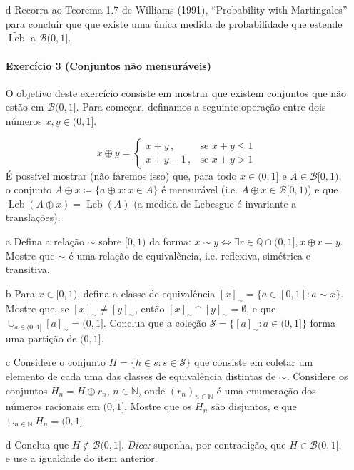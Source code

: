 \documentclass[10pt,a4paper]{article}
\begin{document}
\begin{itemize}
		\item[d] Recorra ao Teorema 1.7 de Williams (1991), ``Probability with Martingales'' para concluir que que existe uma única medida de probabilidade que estende $\widetilde{\operatorname{Leb}}$  a  $\mathcal{B}(0,1]$.
		
		
		\paragraph{Exercício 3 (Conjuntos não mensuráveis)} O objetivo deste exercício consiste em mostrar que existem conjuntos que não estão em $\mathcal{B}(0,1]$.
	Para começar, definamos a seguinte operação entre dois números $x,y \in (0,1]$.
			
			$$x\oplus y = \begin{cases}
				x+y \, , & \text{se } x+ y \leq 1\\
				x+y -1\, , & \text{se } x+y > 1
			\end{cases}$$
					É possível mostrar (não faremos isso) que, para todo $x \in (0,1]$ e $A\in \mathcal{B}[0,1)$, o conjunto $A\oplus x \coloneqq \{a \oplus x: x \in A\}$ é mensurável (i.e. $A\oplus x \in \mathcal{B}[0,1)$) e que $\operatorname{Leb}(A\oplus x) = \operatorname{Leb}(A)$ (a medida de Lebesgue é invariante a translações).
			
			\item[a] Defina a relação $\sim$ sobre $[0,1)$ da forma:
			$x\sim y \iff \exists r \in \mathbb{Q}\cap (0,1], x \oplus r  = y$. Mostre que $\sim$ é uma relação de equivalência, i.e. reflexiva, simétrica e transitiva.
			\item[b] Para $x \in [0,1)$, defina a classe de equivalência $[x]_{\sim} = \{a \in [0,1]: a \sim x\}$. Mostre que, se $[x]_{\sim} \neq [y]_{\sim}$, então $[x]_{\sim} \cap [y]_{\sim} = \emptyset$, e que $\cup_{a \in (0,1]} [a]_{\sim} = (0,1]$. Conclua que a coleção $\mathcal{S} = \{[a]_{\sim}: a \in (0,1]\}$ forma uma partição de $(0,1]$.
			\item[c] Considere o conjunto $H = \{h \in s: s \in \mathcal{S}\}$ que consiste em coletar um elemento de cada uma das classes de equivalência distintas de $\sim$. Considere os conjuntos $H_n = H \oplus r_n$, $n \in \mathbb{N}$, onde $(r_n)_{n \in \mathbb{N}}$ é uma enumeração dos números racionais em $(0,1]$. Mostre que os $H_n$ são disjuntos, e que $\cup_{n \in \mathbb{N}} H_n = (0,1]$.
			\item[d] Conclua que $H \notin \mathcal{B}(0,1]$. \textit{Dica:} suponha, por contradição, que $H \in \mathcal{B}(0,1]$, e use a igualdade do item anterior.
		\end{itemize}
\end{document}
